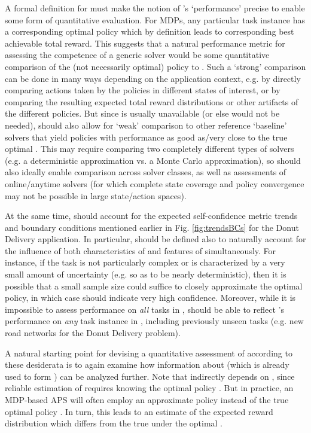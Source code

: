 A formal definition for \xQ{} must make the notion of \solve{}'s `performance' precise to enable some form of quantitative evaluation. For MDPs, any particular task instance \task{} has a corresponding optimal policy \piopt{} which by definition leads to corresponding best achievable total reward. This suggests that a natural performance metric for assessing the competence of a generic solver \solve{} would be some quantitative comparison of the (not necessarily optimal) policy \pigeneric{} to \piopt. Such a `strong' comparison can be done in many ways depending on the application context, e.g. by directly comparing actions taken by the policies in different states of interest, or by comparing the resulting expected total reward distributions or other artifacts of the different policies. 
But since \piopt{} is usually unavailable (or else \solve{} would not be needed), \xQ{} should also allow for `weak' comparison to other reference `baseline' solvers that yield policies with performance as good as/very close to the true optimal \piopt. This may require comparing two completely different types of solvers (e.g. a deterministic approximation vs. a Monte Carlo approximation), so \xQ{} should also ideally enable comparison across solver classes, as well as assessments of online/anytime solvers (for which complete state coverage and policy convergence may not be possible in large state/action spaces).
 
At the same time, \xQ{} should account for the expected self-confidence metric trends and boundary conditions mentioned earlier in Fig. \ref{fig:trendsBCs} for the Donut Delivery application. In particular, \xQ{} should be defined also to naturally account for the influence of both characteristics of \solve{} and features of \task{} simultaneously. For instance, if the task \task{} is not particularly complex or is characterized by a very small amount of uncertainty (e.g. so as to be nearly deterministic), then it is possible that  a small sample size could suffice to closely approximate the optimal policy, in which case \xQ{} should indicate very high confidence. Moreover, while it is impossible to assess performance on \emph{all} tasks in \taskclass{}, \xQ{} should be able to reflect \solve{}'s performance on \emph{any} task instance \task{} in \taskclass{}, including previously unseen tasks (e.g. new road networks for the Donut Delivery problem). 

A natural starting point for devising a quantitative assessment of \xQ{} according to these desiderata is to again examine how information about \rwdapprox{} (which is already used to form \xO{}) can be analyzed further. 
Note that \xO{} indirectly depends on \xQ{}, since reliable estimation of \rwdoptapprox{} requires knowing the optimal policy \piopt. But in practice, an MDP-based APS will often employ an approximate policy \piapprox{} instead of the true optimal policy \piopt. In turn, this leads to an estimate \rwdapprox{} of the expected reward distribution which differs from the true \rwdopt{} under the optimal \piopt.

